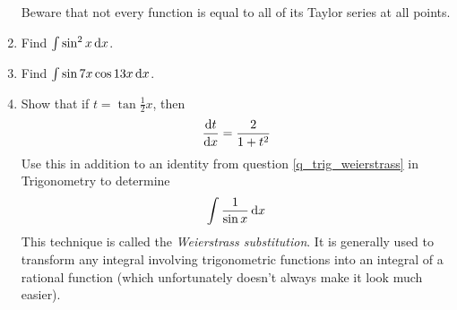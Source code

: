\begin{enumerate}
  Beware that not every function is equal to all of its Taylor series at all
  points.
 \item
  Find \(\integ{\sin^2 x}{x}\).
 \item
  Find \(\integ{\sin 7x \cos 13 x}{x}\).
 \item
  Show that if \(t = \tan \frac 12 x\), then
  \begin{equation*}
   \dv<t>{x} = \frac 2{1 + t^2}
  \end{equation*}
  Use this in addition to an identity from question \ref{q_trig_weierstrass}
  in Trigonometry to determine
  \begin{equation*}
   \integ{\frac 1{\sin x}}{x}
  \end{equation*}
  This technique is called the \emph{Weierstrass substitution}. It is generally
  used to transform any integral involving trigonometric functions into an
  integral of a rational function (which unfortunately doesn't always make it
  look much easier).
\end{enumerate}
